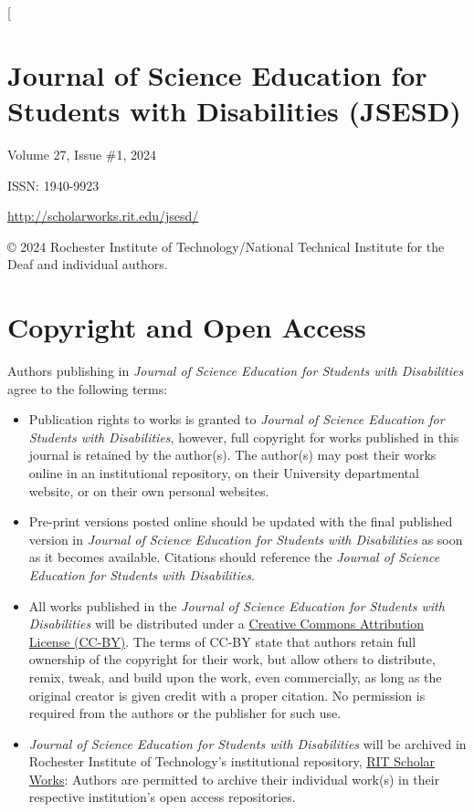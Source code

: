 \documentclass{sig-alternate} %
\begin{document}
\begin{large}
\twocolumn[
\begin{@twocolumnfalse}
\section*{Journal of Science Education for Students with Disabilities (JSESD)}
 
Volume 27, Issue \#1, 2024

ISSN: 1940-9923

\url{http://scholarworks.rit.edu/jsesd/}

© 2024 Rochester Institute of Technology/National Technical Institute for the Deaf and individual authors.

\section*{Copyright and Open Access}
Authors publishing in \textit{Journal of Science Education for Students with Disabilities} agree to the following terms:
\begin{itemize}
    \item Publication rights to works is granted to \textit{Journal of Science Education for Students with Disabilities}, however, full copyright for works published in this journal is retained by the author(s). The author(s) may post their works online in an institutional repository, on their University departmental website, or on their own personal websites.
    \item Pre-print versions posted online should be updated with the final published version in \textit{Journal of Science Education for Students with Disabilities} as soon as it becomes available. Citations should reference the \textit{Journal of Science Education for Students with Disabilities}.
    \item All works published in the \textit{Journal of Science Education for Students with Disabilities} will be distributed under a \href{http://creativecommons.org/licenses/by/3.0/}{Creative Commons Attribution License (CC-BY)}. The terms of CC-BY state that authors retain full ownership of the copyright for their work, but allow others to distribute, remix, tweak, and build upon the work, even commercially, as long as the original creator is given credit with a proper citation. No permission is required from the authors or the publisher for such use.
    \item \textit{Journal of Science Education for Students with Disabilities} will be archived in Rochester Institute of Technology's institutional repository, \href{https://scholarworks.rit.edu/}{RIT Scholar Works}: Authors are permitted to archive their individual work(s) in their respective institution's open access repositories.
\end{itemize}


\end{@twocolumnfalse}
\end{large}
\end{document}
